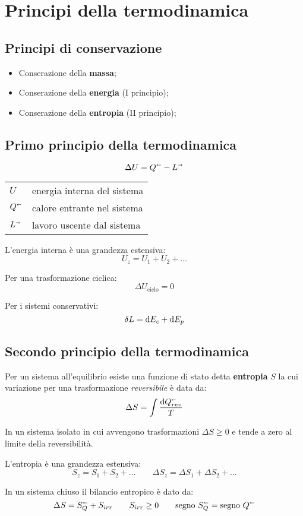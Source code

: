 \section{Principi della termodinamica}

\subsection{Principi di conservazione}
\begin{itemize}
    \item Conserazione della \textbf{massa};
    \item Conserazione della \textbf{energia} (I principio);
    \item Conserazione della \textbf{entropia} (II principio);
\end{itemize}

\subsection{Primo principio della termodinamica}

\[\Delta U = Q^\shortleftarrow - L^\shortrightarrow \]

\begin{tabular}{ll}
    $U$ & energia interna del sistema \\
    $Q^\shortleftarrow$ & calore entrante nel sistema \\
    $L^\shortrightarrow$ & lavoro uscente dal sistema \\
\end{tabular}

L'energia interna è una grandezza estensiva:
\[U_z = U_1 + U_2 + \ldots\]

Per una trasformazione ciclica:
\[\Delta U_{\text{ciclo}} = 0 \]

Per i sistemi conservativi:
\[\var{L} = \dd{E_c} + \dd{E_p}\]


\subsection{Secondo principio della termodinamica}

Per un sistema all'equilibrio esiste una funzione di stato detta \textbf{entropia} $S$ la cui variazione per una trasformazione \emph{reversibile} è data da:
\[\Delta S = \int \frac{\dd{Q_{rev}^\shortleftarrow}}{T}\]

In un sistema isolato in cui avvengono trasformazioni $\Delta S \ge 0$ e tende a zero al limite della reversibilità.

L'entropia è una grandezza estensiva:
\[
    S_z = S_1 + S_2 + \ldots \qquad \Delta S_z = \Delta S_1 + \Delta S_2 + \ldots
\]

In un sistema chiuso il bilancio entropico è dato da:
\[
    \Delta S = S_Q^\shortleftarrow + S_{irr} \qquad S_{irr} \ge 0 \qquad \text{segno}~S_Q^\shortleftarrow = \text{segno}~Q^\shortleftarrow
\]
